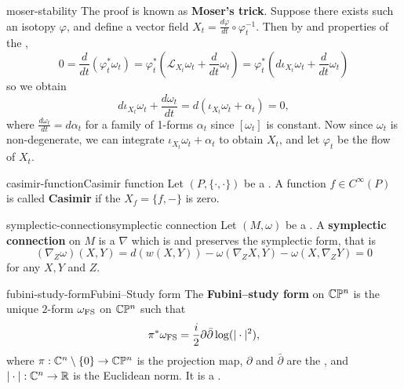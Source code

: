 \begin{example}{moser-stability}
    The proof is known as \textbf{Moser's trick}. Suppose there exists such an isotopy $\varphi$, and define a vector field $X_t = \frac{d \varphi}{d t} \circ \varphi_t^{-1}$. Then by  and properties of the ,
    \[ 0 = \frac{d}{dt} \left(\varphi_t^* \omega_t\right) = \varphi_t^* \left(\mathcal{L}_{X_t} \omega_t + \frac{d}{dt} \omega_t \right) = \varphi_t^* \left(d \iota_{X_t} \omega_t + \frac{d}{dt} \omega_t \right) \]
    so we obtain
    \[ d \iota_{X_t} \omega_t + \frac{d \omega_t}{dt} = d(\iota_{X_t} \omega_t + \alpha_t) = 0 , \]
    where $\frac{d \omega_t}{d t} = d \alpha_t$ for a family of 1-forms $\alpha_t$ since $[\omega_t]$ is constant. Now since $\omega_t$ is non-degenerate, we can integrate $\iota_{X_t} \omega_t + \alpha_t$ to obtain $X_t$, and let $\varphi_t$ be the flow of $X_t$.
\end{example}

\begin{topic}{casimir-function}{Casimir function}
    Let $(P, \{ \cdot, \cdot \})$ be a . A function $f \in C^\infty(P)$ is called \textbf{Casimir} if the  $X_f = \{ f, - \}$ is zero.
\end{topic}

\begin{topic}{symplectic-connection}{symplectic connection}
    Let $(M, \omega)$ be a . A \textbf{symplectic connection} on $M$ is a  $\nabla$ which is  and preserves the symplectic form, that is
    \[ (\nabla_Z \omega)(X, Y) = d(w(X, Y)) - \omega(\nabla_Z X, Y) - \omega(X, \nabla_Z Y) = 0 \]
    for any  $X, Y$ and $Z$.
\end{topic}

\begin{topic}{fubini-study-form}{Fubini--Study form}
    The \textbf{Fubini--study form} on $\mathbb{C} \mathbb{P}^n$ is the unique $2$-form $\omega_\textup{FS}$ on $\mathbb{C} \mathbb{P}^n$ such that
    \[ \pi^* \omega_\textup{FS} = \frac{i}{2} \partial \bar{\partial} \log (|\cdot|^2) , \]
    where $\pi : \mathbb{C}^n \setminus \{ 0 \} \to \mathbb{C} \mathbb{P}^n$ is the projection map, $\partial$ and $\bar{\partial}$ are the , and $|\cdot| : \mathbb{C}^n \to \mathbb{R}$ is the Euclidean norm. It is a .
\end{topic}
